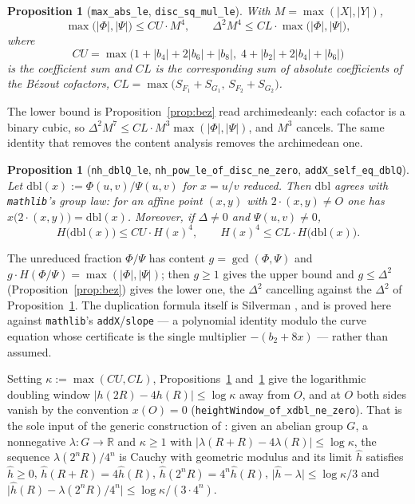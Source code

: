 \documentclass[11pt,reqno]{amsart}
\theoremstyle{plain}
\newtheorem{proposition}[theorem]{Proposition}
\theoremstyle{definition}
\theoremstyle{remark}
\DeclareRobustCommand{\lt}[1]{\texttt{#1}}
\newcommand{\hh}{\widehat{h}}
\newcommand{\nh}{H}
\begin{document}
\begin{proposition}[\lt{max\_abs\_le}, \lt{disc\_sq\_mul\_le}]
\label{prop:dupsize}
With $M = \max(\lvert X\rvert,\lvert Y\rvert)$,
\[
  \max\bigl(\lvert\Phi\rvert,\lvert\Psi\rvert\bigr) \le CU\cdot M^4,
  \qquad
  \Delta^2 M^4 \le CL \cdot
    \max\bigl(\lvert\Phi\rvert,\lvert\Psi\rvert\bigr),
\]
where
\[
  CU = \max\bigl(1 + \lvert b_4\rvert + 2\lvert b_6\rvert +
        \lvert b_8\rvert,\;
        4 + \lvert b_2\rvert + 2\lvert b_4\rvert + \lvert b_6\rvert\bigr)
\]
is the coefficient sum and $CL$ is the corresponding sum of absolute
coefficients of the B\'ezout cofactors,
$CL = \max\bigl(S_{F_1}+S_{G_1},\, S_{F_2}+S_{G_2}\bigr)$.
\end{proposition}

The lower bound is Proposition~\ref{prop:bez} read archimedeanly: each
cofactor is a binary cubic, so
$\Delta^2M^7 \le CL\cdot M^3 \max(\lvert\Phi\rvert,\lvert\Psi\rvert)$,
and $M^3$ cancels. The same identity that removes the content analysis
removes the archimedean one.

\begin{proposition}[\lt{nh\_dblQ\_le},
\lt{nh\_pow\_le\_of\_disc\_ne\_zero}, \lt{addX\_self\_eq\_dblQ}]
\label{prop:dupheight}
Let $\mathrm{dbl}(x) := \Phi(u,v)/\Psi(u,v)$ for $x = u/v$ reduced. Then
$\mathrm{dbl}$ agrees with \texttt{mathlib}'s group law: for an affine
point $(x,y)$ with $2\cdot(x,y) \ne O$ one has
$x\bigl(2\cdot(x,y)\bigr) = \mathrm{dbl}(x)$. Moreover, if
$\Delta \ne 0$ and $\Psi(u,v) \ne 0$,
\[
  \nh\bigl(\mathrm{dbl}(x)\bigr) \le CU\cdot \nh(x)^4,
  \qquad
  \nh(x)^4 \le CL\cdot \nh\bigl(\mathrm{dbl}(x)\bigr).
\]
\end{proposition}

The unreduced fraction $\Phi/\Psi$ has content
$g = \gcd(\Phi,\Psi)$ and $g\cdot \nh(\Phi/\Psi) =
\max(\lvert\Phi\rvert,\lvert\Psi\rvert)$; then $g \ge 1$ gives the upper
bound and $g \le \Delta^2$ (Proposition~\ref{prop:bez}) gives the lower
one, the $\Delta^2$ cancelling against the $\Delta^2$ of
Proposition~\ref{prop:dupsize}. The duplication formula itself is
Silverman \cite[III.2.3(d)]{silverman}, and is proved here against
\texttt{mathlib}'s \lt{addX}/\lt{slope} --- a polynomial identity modulo
the curve equation whose certificate is the single multiplier
$-(b_2 + 8x)$ --- rather than assumed.

Setting $\kappa := \max(CU, CL)$, Propositions~\ref{prop:dupsize}
and~\ref{prop:dupheight} give the logarithmic doubling window
$\lvert h(2R) - 4h(R)\rvert \le \log\kappa$ away from $O$, and at $O$
both sides vanish by the convention $x(O) = 0$
(\lt{heightWindow\_of\_xdbl\_ne\_zero}). That is the sole input of the
generic construction of \cite{MW}: given an abelian group $G$, a
nonnegative $\lambda \colon G \to \mathbb{R}$ and $\kappa \ge 1$ with
$\lvert \lambda(R+R) - 4\lambda(R)\rvert \le \log\kappa$, the sequence
$\lambda(2^nR)/4^n$ is Cauchy with geometric modulus and its limit
$\hh$ satisfies $\hh \ge 0$, $\hh(R+R) = 4\hh(R)$,
$\hh(2^nR) = 4^n\hh(R)$, $\lvert\hh - \lambda\rvert \le \log\kappa/3$
and $\lvert\hh(R) - \lambda(2^nR)/4^n\rvert \le \log\kappa/(3\cdot4^n)$.
\end{document}
